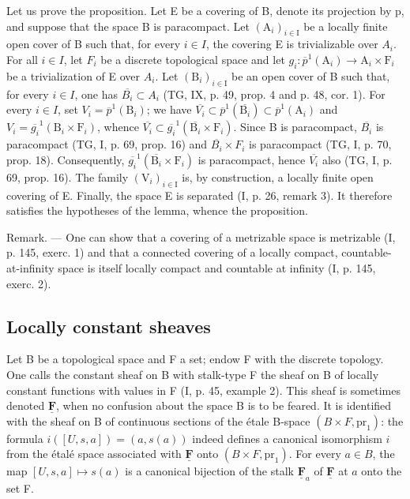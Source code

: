 Let us prove the proposition. Let E be a covering of B, denote its projection by p, and suppose that the space B is paracompact. Let \((\mathrm{A}_{i})_{i\in\mathrm{I}}\) be a locally finite open cover of B such that, for every \(i\in I\), the covering E is trivializable over \(A_{i}\). For all \(i\in I\), let \(F_{i}\) be a discrete topological space and let \(g_{i}\colon\overline{p}^{1}(\mathrm{A}_{i})\to\mathrm{A}_{i}\times\mathrm{F}_{i}\) be a trivialization of E over \(A_{i}\). Let \((\mathrm{B}_{i})_{i\in\mathrm{I}}\) be an open cover of B such that, for every \(i\in I\), one has \(\overline{B_{i}}\subset A_{i}\) (TG, IX, p. 49, prop. 4 and p. 48, cor. 1). For every \(i\in I\), set \(V_{i}=\overline{p}^{1}(\mathrm{B}_{i})\); we have \(\overline{V_{i}}\subset\overline{p}^{1}(\overline{\mathrm{B}_{i}})\subset\overline{p}^{1}(\mathrm{A}_{i})\) and \(V_{i}=\overline{g_{i}}^{1}(\mathrm{B}_{i}\times\mathrm{F}_{i})\), whence \(\overline{V_{i}}\subset\overline{g_{i}}^{1}(\overline{\mathrm{B}_{i}}\times\mathrm{F}_{i})\). Since B is paracompact, \(\overline{B_{i}}\) is paracompact (TG, I, p. 69, prop. 16) and \(\overline{B_{i}}\times F_{i}\) is paracompact (TG, I, p. 70, prop. 18). Consequently, \(\overline{g_{i}}^{1}(\overline{\mathrm{B}_{i}}\times\mathrm{F}_{i})\) is paracompact, hence \(\overline{V_{i}}\) also (TG, I, p. 69, prop. 16). The family \((\mathrm{V}_{i})_{i\in\mathrm{I}}\) is, by construction, a locally finite open covering of E. Finally, the space E is separated (I, p. 26, remark 3). It therefore satisfies the hypotheses of the lemma, whence the proposition.

Remark. --- One can show that a covering of a metrizable space is metrizable (I, p. 145, exerc. 1) and that a connected covering of a locally compact, countable-at-infinity space is itself locally compact and countable at infinity (I, p. 145, exerc. 2).

\subsection{Locally constant sheaves}

Let B be a topological space and F a set; endow F with the discrete topology. One calls the constant sheaf on B with stalk-type F the sheaf on B of locally constant functions with values in F (I, p. 45, example 2). This sheaf is sometimes denoted \(\underline{\mathbf{F}}\), when no confusion about the space B is to be feared. It is identified with the sheaf on B of continuous sections of the étale B-space \((B \times F,\mathrm{pr}_1)\): the formula \(i([U,s,a]) = (a,s(a))\) indeed defines a canonical isomorphism \(i\) from the étalé space associated with \(\underline{\mathbf{F}}\) onto \((B \times F,\mathrm{pr}_1)\). For every \(a \in B\), the map \([U,s,a] \mapsto s(a)\) is a canonical bijection of the stalk \(\underline{\mathbf{F}}_a\) of \(\underline{\mathbf{F}}\) at \(a\) onto the set F.

